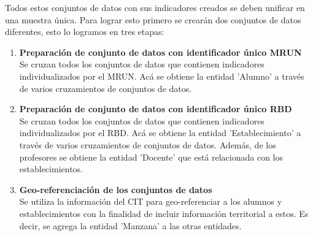 Todos estos conjuntos de datos con sus indicadores creados se deben unificar en una muestra única. Para lograr esto primero se crearán dos conjuntos de datos diferentes, esto lo logramos en tres etapas:
\begin{enumerate}[label=\Roman*]
\item \textbf{Preparación de conjunto de datos con identificador único MRUN} \hfill \\
Se cruzan todos los conjuntos de datos que contienen indicadores individualizados por el MRUN. Acá se obtiene la entidad 'Alumno' a través de varios cruzamientos de conjuntos de datos.
\item \textbf{Preparación de conjunto de datos con identificador único RBD} \hfill \\
Se cruzan todos los conjuntos de datos que contienen indicadores individualizados por el RBD. Acá se obtiene la entidad 'Establecimiento' a través de varios cruzamientos de conjuntos de datos. Además, de los profesores se obtiene la entidad 'Docente' que está relacionada con los establecimientos.
\item \textbf{Geo-referenciación de los conjuntos de datos} \hfill \\
Se utiliza la información del CIT para geo-referenciar a los alumnos y establecimientos con la finalidad de incluir información territorial a estos. Es decir, se agrega la entidad 'Manzana' a las otras entidades.
\end{enumerate}

